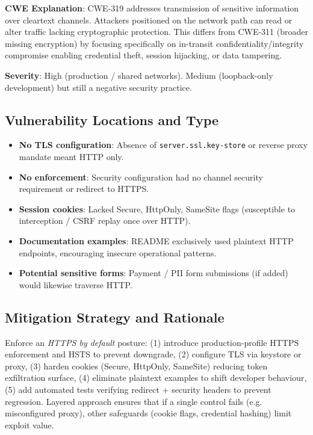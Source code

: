 \documentclass[]{UCD_CS_FYP_Report}
\begin{document}
	\textbf{CWE Explanation}: CWE-319 addresses transmission of sensitive information over cleartext channels. Attackers positioned on the network path can read or alter traffic lacking cryptographic protection. This differs from CWE-311 (broader missing encryption) by focusing specifically on in-transit confidentiality/integrity compromise enabling credential theft, session hijacking, or data tampering.

	\textbf{Severity}: High (production / shared networks). Medium (loopback-only development) but still a negative security practice.

\subsection*{Vulnerability Locations and Type}
\begin{itemize}
	\item \textbf{No TLS configuration}: Absence of \texttt{server.ssl.key-store} or reverse proxy mandate meant HTTP only.
	\item \textbf{No enforcement}: Security configuration had no channel security requirement or redirect to HTTPS.
	\item \textbf{Session cookies}: Lacked Secure, HttpOnly, SameSite flags (susceptible to interception / CSRF replay once over HTTP).
	\item \textbf{Documentation examples}: README exclusively used plaintext HTTP endpoints, encouraging insecure operational patterns.
	\item \textbf{Potential sensitive forms}: Payment / PII form submissions (if added) would likewise traverse HTTP.
\end{itemize}

\subsection*{Mitigation Strategy and Rationale}
Enforce an \textit{HTTPS by default} posture: (1) introduce production-profile HTTPS enforcement and HSTS to prevent downgrade, (2) configure TLS via keystore or proxy, (3) harden cookies (Secure, HttpOnly, SameSite) reducing token exfiltration surface, (4) eliminate plaintext examples to shift developer behaviour, (5) add automated tests verifying redirect + security headers to prevent regression. Layered approach ensures that if a single control fails (e.g. misconfigured proxy), other safeguards (cookie flags, credential hashing) limit exploit value.
\end{document}
